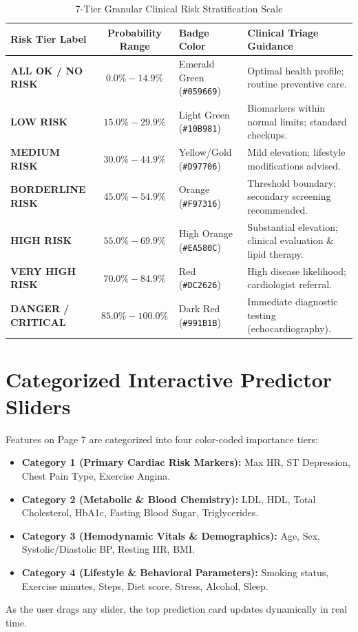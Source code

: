 \begin{table}[H]
\centering
\caption{7-Tier Granular Clinical Risk Stratification Scale}
\label{tab:risk_scale}
\small
\begin{tabular}{lcll}
\toprule
\textbf{Risk Tier Label} & \textbf{Probability Range} & \textbf{Badge Color} & \textbf{Clinical Triage Guidance} \\
\midrule
\textbf{ALL OK / NO RISK} & $0.0\% - 14.9\%$ & Emerald Green (\texttt{\#059669}) & Optimal health profile; routine preventive care. \\
\textbf{LOW RISK} & $15.0\% - 29.9\%$ & Light Green (\texttt{\#10B981}) & Biomarkers within normal limits; standard checkups. \\
\textbf{MEDIUM RISK} & $30.0\% - 44.9\%$ & Yellow/Gold (\texttt{\#D97706}) & Mild elevation; lifestyle modifications advised. \\
\textbf{BORDERLINE RISK} & $45.0\% - 54.9\%$ & Orange (\texttt{\#F97316}) & Threshold boundary; secondary screening recommended. \\
\textbf{HIGH RISK} & $55.0\% - 69.9\%$ & High Orange (\texttt{\#EA580C}) & Substantial elevation; clinical evaluation \& lipid therapy. \\
\textbf{VERY HIGH RISK} & $70.0\% - 84.9\%$ & Red (\texttt{\#DC2626}) & High disease likelihood; cardiologist referral. \\
\textbf{DANGER / CRITICAL} & $85.0\% - 100.0\%$ & Dark Red (\texttt{\#991B1B}) & Immediate diagnostic testing (echocardiography). \\
\bottomrule
\end{tabular}
\end{table}

\section{Categorized Interactive Predictor Sliders}
Features on Page 7 are categorized into four color-coded importance tiers:
\begin{itemize}
    \item \textbf{Category 1 (Primary Cardiac Risk Markers):} Max HR, ST Depression, Chest Pain Type, Exercise Angina.
    \item \textbf{Category 2 (Metabolic \& Blood Chemistry):} LDL, HDL, Total Cholesterol, HbA1c, Fasting Blood Sugar, Triglycerides.
    \item \textbf{Category 3 (Hemodynamic Vitals \& Demographics):} Age, Sex, Systolic/Diastolic BP, Resting HR, BMI.
    \item \textbf{Category 4 (Lifestyle \& Behavioral Parameters):} Smoking status, Exercise minutes, Steps, Diet score, Stress, Alcohol, Sleep.
\end{itemize}
As the user drags any slider, the top prediction card updates dynamically in real time.
